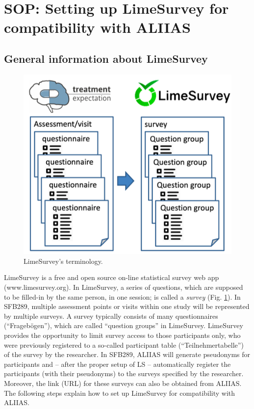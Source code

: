 \pagebreak
\section{SOP: Setting up LimeSurvey for compatibility with ALIIAS}
\label{section:ls_setup}

\subsection*{General information about LimeSurvey}

\begin{figure}
\centering
\includegraphics{docs/fig/ls_conventions.png}
\caption{LimeSurvey's terminology.}
\label{fig:ls_conventions}
\end{figure}

LimeSurvey is a free and open source on-line statistical survey web app (www.limesurvey.org).
In LimeSurvey, a series of questions, which are supposed to be filled-in by the same person, in one session; is called a \emph{survey} (Fig. \ref{fig:ls_conventions}).
In SFB289, multiple assessment points or visits within one study will be represented by multiple surveys.
A survey typically consists of many questionnaires (“Fragebögen”), which are called “question groups” in LimeSurvey.
LimeSurvey provides the opportunity to limit survey access to those participants only, who were previously registered to a so-called participant table (“Teilnehmertabelle”) of the survey by the researcher. In SFB289, ALIIAS will generate pseudonyms for participants and – after the proper setup of LS – automatically register the participants (with their pseudonyms) to the surveys specified by the researcher. Moreover, the link (URL) for these surveys can also be obtained from ALIIAS. The following steps explain how to set up LimeSurvey for compatibility with ALIIAS.

